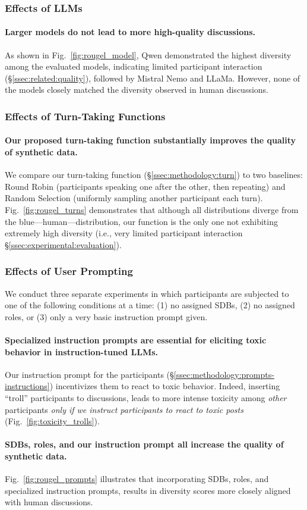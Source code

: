 \subsubsection{Effects of LLMs}

\paragraph{Larger models do not lead to more high-quality discussions.} As shown in Fig.~\ref{fig:rougel_model}, Qwen demonstrated the highest diversity among the evaluated models, indicating limited participant interaction (\S\ref{ssec:related:quality}), followed by Mistral Nemo and LLaMa. However, none of the models closely matched the diversity observed in human discussions. 


\subsubsection{Effects of Turn-Taking Functions}


\paragraph{Our proposed turn-taking function substantially improves the quality of synthetic data.} We compare our turn-taking function (\S\ref{ssec:methodology:turn}) to two baselines: Round Robin (participants speaking one after the other, then repeating) and Random Selection (uniformly sampling another participant each turn). Fig.~\ref{fig:rougel_turns} demonstrates that although all distributions diverge from the blue—human—distribution, our function is the only one not exhibiting extremely high diversity (i.e., very limited participant interaction \S\ref{ssec:experimental:evaluation}).


\subsubsection{Effects of User Prompting}

We conduct three separate experiments in which participants are subjected to one of the following conditions at a time: (1) no assigned SDBs, (2) no assigned roles, or (3) only a very basic instruction prompt given. 

\paragraph{Specialized instruction prompts are essential for eliciting toxic behavior in instruction-tuned LLMs.} Our instruction prompt for the participants (\S\ref{ssec:methodology:prompts-instructions}) incentivizes them to react to toxic behavior. Indeed, inserting “troll” participants to discussions, leads to more intense toxicity among \emph{other} participants \emph{only if we instruct participants to react to toxic posts} (Fig.~\ref{fig:toxicity_trolls}). 

\paragraph{SDBs, roles, and our instruction prompt all increase the quality of synthetic data.} Fig.~\ref{fig:rougel_prompts} illustrates that incorporating SDBs, roles, and specialized instruction prompts, results in diversity scores more closely aligned with human discussions.
